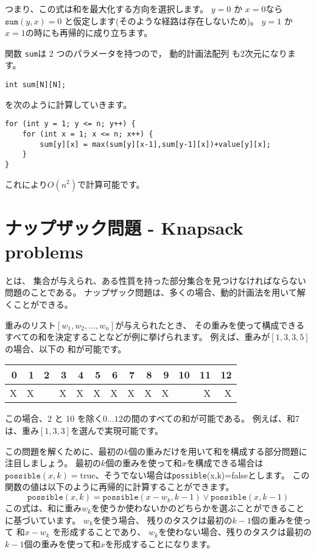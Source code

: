 つまり、この式は和を最大化する方向を選択します。
$y=0$ か $x=0$なら $\texttt{sum}(y,x)=0$ と仮定します(そのような経路は存在しないため)。
$y=1$ か $x=1$の時にも再帰的に成り立ちます。

関数 \texttt{sum}は 2 つのパラメータを持つので，
動的計画法配列 も2次元になります。

\begin{lstlisting}
int sum[N][N];
\end{lstlisting}
を次のように計算していきます。
\begin{lstlisting}
for (int y = 1; y <= n; y++) {
    for (int x = 1; x <= n; x++) {
        sum[y][x] = max(sum[y][x-1],sum[y-1][x])+value[y][x];
    }
}
\end{lstlisting}

これにより$O(n^2)$で計算可能です。

\section{ナップザック問題 - Knapsack problems}


とは、
集合が与えられ、ある性質を持った部分集合を見つけなければならない問題のことである。
ナップザック問題は、多くの場合、動的計画法を用いて解くことができる。

重みのリスト$[w_1,w_2,\ldots,w_n]$が与えられたとき、
その重みを使って構成できるすべての和を決定することなどが例に挙げられます。
例えば、重みが$[1,3,3,5]$の場合、以下の 和が可能です。

\begin{center}
\begin{tabular}{rrrrrrrrrrrrr}
 0 & 1 & 2 & 3 & 4 & 5 & 6 & 7 & 8 & 9 & 10 & 11 & 12 \\
\hline
 X & X & & X & X & X & X & X & X & X & & X & X \\
\end{tabular}
\end{center}

この場合、2 と 10 を除く$0 \ldots 12$の間のすべての和が可能である。
例えば、和7は、重み$[1,3,3]$を選んで実現可能です。

この問題を解くために、最初の$k$個の重みだけを用いて和を構成する部分問題に注目しましょう。
最初の$k$個の重みを使って和$x$を構成できる場合は
$\texttt{possible}(x,k)=\textrm{true}、
そうでない場合は
$\texttt{possible}(x,k)=\textrm{false}とします。
この関数の値は以下のように再帰的に計算することができます。
\[ \texttt{possible}(x,k) = \texttt{possible}(x-w_k,k-1) \lor \texttt{possible}(x,k-1) \]
この式は、和に重み$w_k$を使うか使わないかのどちらかを選ぶことができることに基づいています。
$w_k$を使う場合、
残りのタスクは最初の$k - 1$個の重みを使って 和$x-w_k$ を形成することであり、
$w_k$を使わない場合、残りのタスクは最初の$k - 1$個の重みを使って和$x$を形成することになります。

